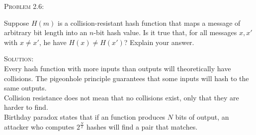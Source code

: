 \documentclass[12pt]{article}
\newenvironment{problem}[1]
{\begin{mdframed}[linewidth=0.8pt]
        \textsc{Problem #1:}

}
    {\end{mdframed}}
\newenvironment{solution}
    {\textsc{Solution:}\\}
    {\newpage}%
\begin{document}
	\begin{problem}{2.6}
		Suppose $H\left( m \right) $ is a collision-resistant hash function that maps
		a message of arbitrary bit length into an $n$-bit hash value. Is it
		true that, for all messages  $x,x'$ with  $x \neq x'$, he have
		$H\left( x \right) \neq H\left( x' \right) $? Explain your answer.
	\end{problem}
	\begin{solution}
		Every hash function with more inputs than outputs will theoretically have collisions.
		The pigeonhole principle guarantees that some inputs will hash to the same outputs.
		\\
		Collision resistance does not mean that no collisions exist, only that they are harder
		to find.\\
		Birthday paradox states that if an function produces $N$ bits of output, an attacker
		who computes  $2^{\frac{N}{2}}$ hashes will find a pair that matches.
	\end{solution}
                
\end{document}
